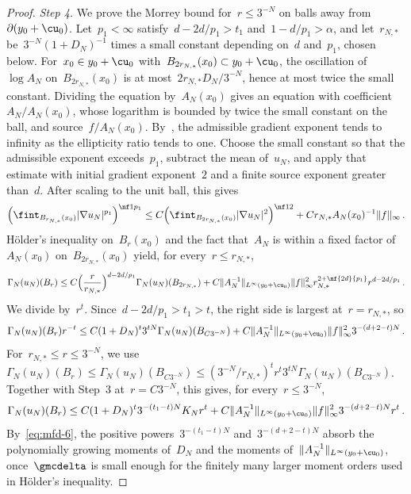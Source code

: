 \documentclass[11pt]{amsart}
\begin{document}
\begin{proof}
\emph{Step 4.} We prove the Morrey bound for~$r\leq3^{-N}$ on balls away from~$\partial(y_0+\cu_0)$. Let~$p_1<\infty$ satisfy~$d-2d/p_1>t_1$ and~$1-d/p_1>\alpha$, and let~$r_{N,*}$ be~$3^{-N}(1+D_N)^{-1}$ times a small constant depending on~$d$ and~$p_1$, chosen below. For~$x_0\in y_0+\cu_0$ with~$B_{2r_{N,*}}(x_0)\subset y_0+\cu_0$, the oscillation of~$\log A_N$ on~$B_{2r_{N,*}}(x_0)$ is at most~$2r_{N,*}D_N/3^{-N}$, hence at most twice the small constant. Dividing the equation by~$A_N(x_0)$ gives an equation with coefficient~$A_N/A_N(x_0)$, whose logarithm is bounded by twice the small constant on the ball, and source~$f/A_N(x_0)$. By~\citet[Theorem~2, equation~(48)]{Meyers1963}, the admissible gradient exponent tends to infinity as the ellipticity ratio tends to one. Choose the small constant so that the admissible exponent exceeds~$p_1$, subtract the mean of~$u_N$, and apply that estimate with initial gradient exponent~$2$ and a finite source exponent greater than~$d$. After scaling to the unit ball, this gives
\begin{equation*}
	\Bigl(\fint_{B_{r_{N,*}}(x_0)}|\nabla u_N|^{p_1}\Bigr)^{\nf1{p_1}}\leq C\Bigl(\fint_{B_{2r_{N,*}}(x_0)}|\nabla u_N|^2\Bigr)^{\nf12}+Cr_{N,*}A_N(x_0)^{-1}\|f\|_\infty\,.
\end{equation*}
H\"older's inequality on~$B_r(x_0)$ and the fact that~$A_N$ is within a fixed factor of~$A_N(x_0)$ on~$B_{2r_{N,*}}(x_0)$ yield, for every~$r\leq r_{N,*}$,
\begin{equation}
	\Gamma_N(u_N)(B_r)\leq C\Bigl(\frac r{r_{N,*}}\Bigr)^{d-2d/p_1}\Gamma_N(u_N)(B_{2r_{N,*}})
	+C\|A_N^{-1}\|_{L^\infty(y_0+\cu_0)}\|f\|_\infty^2r_{N,*}^{2+\nf{2d}{p_1}}r^{d-2d/p_1}\,.
	\label{eq:mfd-micro}
\end{equation}
We divide by~$r^t$. Since~$d-2d/p_1>t_1>t$, the right side is largest at~$r=r_{N,*}$, so
\begin{equation*}
	\Gamma_N(u_N)(B_r)r^{-t}\leq C(1+D_N)^t3^{tN}\Gamma_N(u_N)(B_{C3^{-N}})+C\|A_N^{-1}\|_{L^\infty(y_0+\cu_0)}\|f\|_\infty^23^{-(d+2-t)N}\,.
\end{equation*}
For~$r_{N,*}\leq r\leq3^{-N}$, we use~$\Gamma_N(u_N)(B_r)\leq\Gamma_N(u_N)(B_{C3^{-N}})\leq(3^{-N}/r_{N,*})^tr^t3^{tN}\Gamma_N(u_N)(B_{C3^{-N}})$. Together with Step~3 at~$r=C3^{-N}$, this gives, for every~$r\leq3^{-N}$,
\begin{equation*}
	\Gamma_N(u_N)(B_r)\leq C(1+D_N)^t3^{-(t_1-t)N}K_Nr^t
	+C\|A_N^{-1}\|_{L^\infty(y_0+\cu_0)}\|f\|^2_\infty3^{-(d+2-t)N}r^t\,.
\end{equation*}
By~\eqref{eq:mfd-6}, the positive powers~$3^{-(t_1-t)N}$ and~$3^{-(d+2-t)N}$ absorb the polynomially growing moments of~$D_N$ and the moments of~$\|A_N^{-1}\|_{L^\infty(y_0+\cu_0)}$, once~$\gmcdelta$ is small enough for the finitely many larger moment orders used in H\"older's inequality.


\end{proof}
\end{document}
